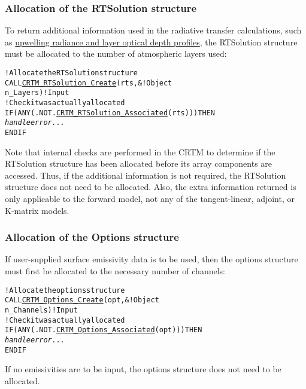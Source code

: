 \subsubsection{Allocation of the RTSolution structure}
To return additional information used in the radiative transfer calculations, such as \hyperref[sec:rtsolution_structure]{upwelling radiance and layer optical depth profiles}, the RTSolution structure must be allocated to the number of atmospheric layers used:
\begin{alltt}
  ! Allocate the RTSolution structure
  CALL \hyperref[sec:CRTM_RTSolution_Create_interface]{CRTM_RTSolution_Create}( rts     , &  ! Object
                               n_Layers  )  ! Input
  ! Check it was actually allocated
  IF ( ANY(.NOT. \hyperref[sec:CRTM_RTSolution_Associated_interface]{CRTM_RTSolution_Associated}( rts )) ) THEN 
    \textrm{\textit{handle error...}}
  END IF\end{alltt}
Note that internal checks are performed in the CRTM to determine if the RTSolution structure has been allocated before its array components are accessed. Thus, if the additional information is not required, the RTSolution structure does not need to be allocated. Also, the extra information returned is only applicable to the forward model, not any of the tangent-linear, adjoint, or K-matrix models.

\subsubsection{Allocation of the Options structure}
If user-supplied surface emissivity data is to be used, then the options structure must first be allocated to the necessary number of channels:
\begin{alltt}
  ! Allocate the options structure
  CALL \hyperref[sec:CRTM_Options_Create_interface]{CRTM_Options_Create}( opt       , &  ! Object
                            n_Channels  )  ! Input
  ! Check it was actually allocated
  IF ( ANY(.NOT. \hyperref[sec:CRTM_Options_Associated_interface]{CRTM_Options_Associated}( opt )) ) THEN 
    \textrm{\textit{handle error...}}
  END IF\end{alltt}
If no emissivities are to be input, the options structure does not need to be allocated.


